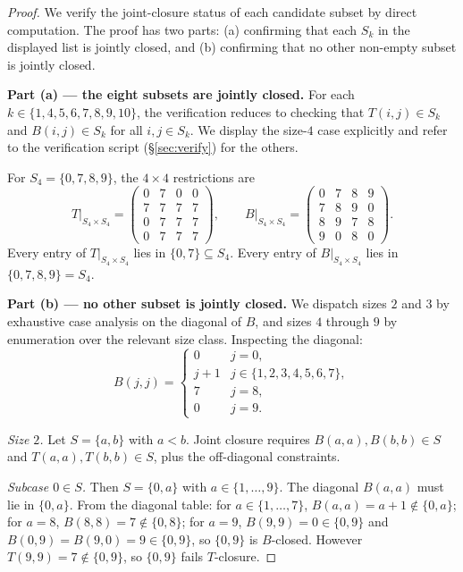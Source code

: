 \documentclass[11pt,reqno]{amsart}
\theoremstyle{plain}
\theoremstyle{definition}
\theoremstyle{remark}
\begin{document}
\begin{proof}
We verify the joint-closure status of each candidate subset by
direct computation. The proof has two parts: (a) confirming that
each $S_{k}$ in the displayed list is jointly closed, and (b)
confirming that no other non-empty subset is jointly closed.

\textbf{Part (a) — the eight subsets are jointly closed.} For
each $k\in\{1,4,5,6,7,8,9,10\}$, the verification reduces to
checking that $T(i,j)\in S_{k}$ and $B(i,j)\in S_{k}$ for all
$i,j\in S_{k}$. We display the size-$4$ case explicitly and refer
to the verification script (\S\ref{sec:verify}) for the others.

For $S_{4}=\{0,7,8,9\}$, the $4\times 4$ restrictions are
\[
T\big|_{S_{4}\times S_{4}}=\begin{pmatrix}
0 & 7 & 0 & 0 \\
7 & 7 & 7 & 7 \\
0 & 7 & 7 & 7 \\
0 & 7 & 7 & 7
\end{pmatrix},
\qquad
B\big|_{S_{4}\times S_{4}}=\begin{pmatrix}
0 & 7 & 8 & 9 \\
7 & 8 & 9 & 0 \\
8 & 9 & 7 & 8 \\
9 & 0 & 8 & 0
\end{pmatrix}.
\]
Every entry of $T\big|_{S_{4}\times S_{4}}$ lies in
$\{0,7\}\subseteq S_{4}$. Every entry of
$B\big|_{S_{4}\times S_{4}}$ lies in $\{0,7,8,9\}=S_{4}$.

\textbf{Part (b) — no other subset is jointly closed.} We
dispatch sizes $2$ and $3$ by exhaustive case analysis on the
diagonal of $B$, and sizes $4$ through $9$ by enumeration over
the relevant size class. Inspecting the diagonal:
\[
B(j,j)=\begin{cases}
0 & j=0,\\
j+1 & j\in\{1,2,3,4,5,6,7\},\\
7 & j=8,\\
0 & j=9.
\end{cases}
\]

\emph{Size $2$.} Let $S=\{a,b\}$ with $a<b$. Joint closure
requires $B(a,a),B(b,b)\in S$ and $T(a,a),T(b,b)\in S$, plus the
off-diagonal constraints.

\emph{Subcase $0\in S$.} Then $S=\{0,a\}$ with $a\in\{1,\dots,9\}$.
The diagonal $B(a,a)$ must lie in $\{0,a\}$. From the diagonal
table: for $a\in\{1,\dots,7\}$, $B(a,a)=a+1\notin\{0,a\}$; for
$a=8$, $B(8,8)=7\notin\{0,8\}$; for $a=9$, $B(9,9)=0\in\{0,9\}$
and $B(0,9)=B(9,0)=9\in\{0,9\}$, so $\{0,9\}$ is $B$-closed.
However $T(9,9)=7\notin\{0,9\}$, so $\{0,9\}$ fails $T$-closure.


\end{proof}
\end{document}
